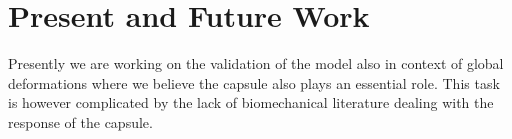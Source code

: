 \documentclass{acm_proc_article-sp}
\def\wrt{w.\,r.\,t.}
\def\ie{i.\,e.}
\begin{document}
%


\section{Present and Future Work} %

Presently we are working on the validation of the model also in context of
global deformations where we believe the capsule also plays an essential role.
This task is however complicated by the lack of biomechanical literature
dealing with the response of the capsule.
\end{document}
